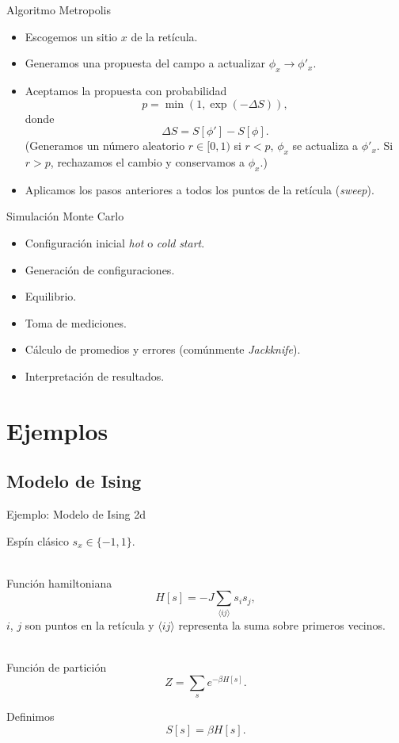 \documentclass[11pt]{beamer}
\begin{document}
\begin{frame}{Algoritmo Metropolis}
    \begin{itemize}
        \item Escogemos un sitio $x$ de la retícula.
        \item Generamos una propuesta del campo a actualizar $\phi_x \to \phi'_x$.
        \item Aceptamos la propuesta con probabilidad 
        $$ p = \min\left(1, \exp\left(-\Delta S\right)\right),$$
           donde
        $$ \Delta S = S[\phi'] - S[\phi].$$        
        (Generamos un número aleatorio $r\in[0,1)$ si $r<p$, $\phi_x$ se actualiza a $\phi'_x$. Si $r>p$, rechazamos el cambio y conservamos a $\phi_x$.)
      
      	\item Aplicamos los pasos anteriores a todos los puntos de la retícula (\emph{sweep}). 
    \end{itemize}
\end{frame}

\begin{frame}{Simulación Monte Carlo}

    \begin{itemize}
    		\item Configuración inicial \emph{hot} o \emph{cold} \emph{start}.
        \item Generación de configuraciones.
        \item Equilibrio.
        \item Toma de mediciones.
        \item Cálculo de promedios y errores (comúnmente \emph{Jackknife}).
        \item Interpretación de resultados.
    \end{itemize}

\end{frame}

\section{Ejemplos}
\subsection{Modelo de Ising}
\begin{frame}{Ejemplo: Modelo de Ising 2d}

Espín clásico $s_x\in\{-1,1\}$. \\~

Función hamiltoniana
$$ H[s] = -J\sum_{\langle ij \rangle} s_i s_j,$$
$i$, $j$ son puntos en la retícula y $\langle ij \rangle$ representa la suma sobre primeros vecinos.\\~

Función de partición
$$ Z = \sum_s e^{-\beta H[s]}.$$

Definimos
$$S[s] = \beta H[s].$$

\end{frame}
\end{document}
